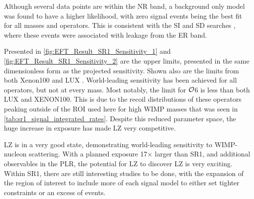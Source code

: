 


\par
Although several data points are within the NR band, a background only model was found to have a higher likelihood, with zero signal events being the best fit for all masses and operators.
This is consistent with the SI and SD searches \cite{lz_ws_sr1_ref}, where these events were associated with leakage from the ER band.

\par
Presented in \autoref{fig:EFT_Result_SR1_Sensitivity_1} and \autoref{fig:EFT_Result_SR1_Sensitivity_2} are the upper limits, presented in the same dimensionless form as the projected sensitivity.
Shown also are the limits from both Xenon100 \cite{xenon100_eft_ref} and LUX \cite{LUX_RUN4_EFT_2021}.
World-leading sensitivity has been achieved for all operators, but not at every mass.
Most notably, the limit for $\operatorname{\mathcal{O}}$6 is less than both LUX and XENON100.
This is due to the recoil distributions of these operators peaking outside of the ROI used here for high WIMP masses that was seen in \autoref{tab:sr1_signal_integrated_rates}.
Despite this reduced parameter space, the huge increase in exposure has made LZ very competitive.


\par
LZ is in a very good state, demonstrating world-leading sensitivity to WIMP-nucleon scattering.
With a planned exposure 17$\times$ larger than SR1, and additional observables in the PLR, the potential for LZ to discover LZ is very exciting.
Within SR1, there are still interesting studies to be done, with the expansion of the region of interest to include more of each signal model to either set tighter constraints or an excess of events.

